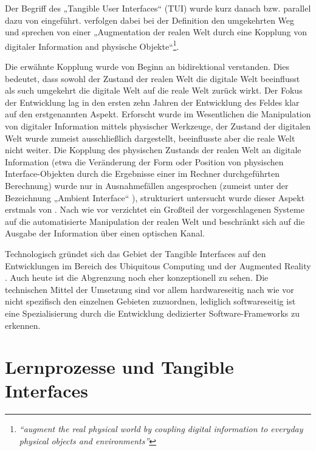 Der Begriff des „Tangible User Interfaces“ (TUI) wurde kurz danach bzw. parallel dazu von \citet{Ishii97} eingeführt. \citeauthor{Ishii97} verfolgen dabei bei der Definition den umgekehrten Weg und sprechen von einer „Augmentation der realen Welt durch eine Kopplung von digitaler Information and physische Objekte“\footnote{\emph{“augment the real physical world by coupling digital information to everyday physical objects and environments”}\citep{Ishii97}}. 

Die erwähnte Kopplung wurde von Beginn an bidirektional verstanden. Dies bedeutet, dass sowohl der Zustand der realen Welt die digitale Welt beeinflusst als such umgekehrt die digitale Welt auf die reale Welt zurück wirkt. Der Fokus der Entwicklung lag in den ersten zehn Jahren der Entwicklung des Feldes klar auf den erstgenannten Aspekt. Erforscht wurde im Wesentlichen die Manipulation von digitaler Information mittels physischer Werkzeuge, der Zustand der digitalen Welt wurde zumeist ausschließlich dargestellt, beeinflusste aber die reale Welt nicht weiter. Die Kopplung des physischen Zustands der realen Welt an digitale Information (etwa die Veränderung der Form oder Position von physischen Interface-Objekten durch die Ergebnisse einer im Rechner durchgeführten Berechnung) wurde nur in Ausnahmefällen angesprochen (zumeist unter der Bezeichnung „Ambient Interface“ \citep{Gross03}), strukturiert untersucht wurde dieser Aspekt erstmals von \citet{Patten07}. Nach wie vor verzichtet ein Großteil der vorgeschlagenen Systeme auf die automatisierte Manipulation der realen Welt und beschränkt sich auf die Ausgabe der Information über einen optischen Kanal.

Technologisch gründet sich das Gebiet der Tangible Interfaces auf den Entwicklungen im Bereich des Ubiquitous Computing \citep{Weiser91} und der Augmented Reality \citep{Azuma97}. Auch heute ist die Abgrenzung noch eher konzeptionell zu sehen. Die technischen Mittel der Umsetzung sind vor allem hardwareseitig nach wie vor nicht spezifisch den einzelnen Gebieten zuzuordnen, lediglich softwareseitig ist eine Spezialisierung durch die Entwicklung dedizierter Software-Frameworks zu erkennen.

\section{Lernprozesse und Tangible Interfaces} %
\label{sec:lernprozesse_und_tangible_interface}

